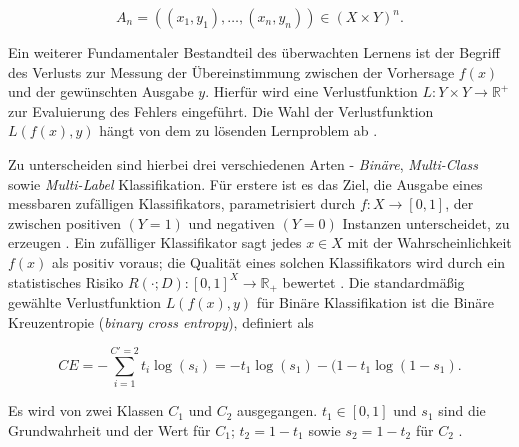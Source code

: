 \begin{equation}
	A_{n} = ((x_{1},y_{1}),\dots,(x_{n},y_{n})) \in (X \times Y)^{n}.
\end{equation}

Ein weiterer Fundamentaler Bestandteil des überwachten Lernens ist der Begriff des Verlusts zur Messung der Übereinstimmung zwischen der Vorhersage $f(x)$ und der gewünschten Ausgabe $y$. Hierfür wird eine Verlustfunktion $L:Y \times Y \longrightarrow \mathbb{R}^+$ zur Evaluierung des Fehlers eingeführt. Die Wahl der Verlustfunktion $L(f(x),y)$ hängt von dem zu lösenden Lernproblem ab \cite[22]{Cord2008}. 

Zu unterscheiden sind hierbei drei verschiedenen Arten - \emph{Binäre}, \emph{Multi-Class} sowie \emph{Multi-Label} Klassifikation. Für erstere ist es das Ziel, die Ausgabe eines messbaren zufälligen Klassifikators, parametrisiert durch $f:X\rightarrow [0,1]$, der zwischen positiven $(Y=1)$ und negativen $(Y=0)$ Instanzen unterscheidet, zu erzeugen \cite[2\psq]{pmlr-v81-menon18a}. Ein zufälliger Klassifikator sagt jedes $x \in X$ mit der Wahrscheinlichkeit $f(x)$ als positiv voraus; die Qualität eines solchen Klassifikators wird durch ein statistisches Risiko $R(\cdot;D): [0,1]^X \rightarrow \mathbb{R}_{+} $ bewertet \cite[3]{pmlr-v81-menon18a}. Die standardmäßig gewählte Verlustfunktion $L(f(x),y)$ für Binäre Klassifikation ist die Binäre Kreuzentropie (\emph{binary cross entropy}), definiert als

\begin{equation}
	CE = - \sum_{i=1}^{C'=2}{t_i \log(s_i) = -t_1 \log(s_1) - (1-t_1} \log(1-s_1).
\end{equation}

Es wird von zwei Klassen $C_1$ und $C_2$ ausgegangen. $t_1 \in [0,1]$ und $s_1$ sind die Grundwahrheit und der Wert für $C_1$; $t_2 = 1 - t_1$ sowie $s_2 = 1 - t_2$ für $C_2$ \cite{rubinstein2014cross}.

